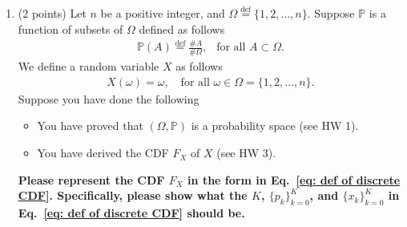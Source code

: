 \documentclass[11pt]{article}
\newcommand{\1}{\mathbb{1}}
\begin{document}
\begin{enumerate}

\item (2 points) Let $n$ be a positive integer, and $\Omega \overset{\operatorname{def}}{=}\{1,2,\ldots,n\}$. Suppose $\mathbb{P}$ is a function of subsets of $\Omega$ defined as follows
\begin{align*}
\mathbb{P}(A)\overset{\operatorname{def}}{=}\frac{\# A}{\#\Omega}, \ \ \text{ for all }A\subset \Omega.
\end{align*}
We define a random variable $X$ as follows
\begin{align*}
    X(\omega)=\omega,\ \ \ \text{ for all }\omega\in\Omega=\{1,2,\ldots,n\}.
\end{align*}
Suppose you have done the following
\begin{itemize}
    \item You have proved that $(\Omega,\mathbb{P})$ is a probability space (see HW 1).
    \item You have derived the CDF $F_X$ of $X$ (see HW 3).
\end{itemize}

\textbf{Please represent the CDF $F_X$ in the form in Eq.~\eqref{eq: def of discrete CDF}. Specifically, please show what the $K$, $\{p_k\}_{k=0}^K$, and $\{x_k\}_{k=0}^K$ in Eq.~\eqref{eq: def of discrete CDF} should be.}



\end{enumerate}
\end{document}
